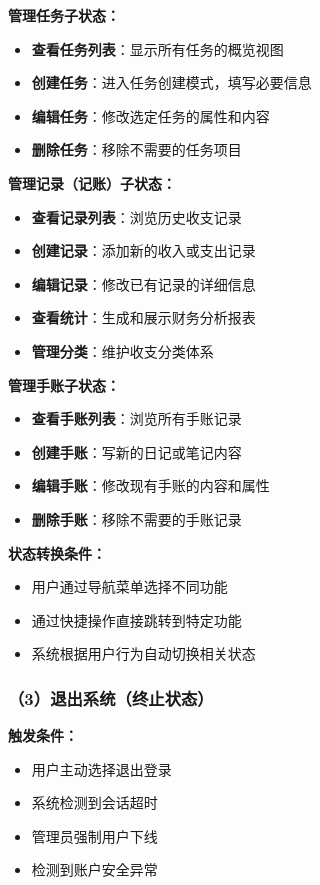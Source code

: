 \documentclass[a4paper]{article}
\begin{document}
\textbf{管理任务子状态：}
\begin{itemize}
    \item \textbf{查看任务列表}：显示所有任务的概览视图
    \item \textbf{创建任务}：进入任务创建模式，填写必要信息
    \item \textbf{编辑任务}：修改选定任务的属性和内容
    \item \textbf{删除任务}：移除不需要的任务项目
\end{itemize}

\textbf{管理记录（记账）子状态：}
\begin{itemize}
    \item \textbf{查看记录列表}：浏览历史收支记录
    \item \textbf{创建记录}：添加新的收入或支出记录
    \item \textbf{编辑记录}：修改已有记录的详细信息
    \item \textbf{查看统计}：生成和展示财务分析报表
    \item \textbf{管理分类}：维护收支分类体系
\end{itemize}

\textbf{管理手账子状态：}
\begin{itemize}
    \item \textbf{查看手账列表}：浏览所有手账记录
    \item \textbf{创建手账}：写新的日记或笔记内容
    \item \textbf{编辑手账}：修改现有手账的内容和属性
    \item \textbf{删除手账}：移除不需要的手账记录
\end{itemize}

\textbf{状态转换条件：}
\begin{itemize}
    \item 用户通过导航菜单选择不同功能
    \item 通过快捷操作直接跳转到特定功能
    \item 系统根据用户行为自动切换相关状态
\end{itemize}

\subsubsection{（3）退出系统（终止状态）}

\textbf{触发条件：}
\begin{itemize}
    \item 用户主动选择退出登录
    \item 系统检测到会话超时
    \item 管理员强制用户下线
    \item 检测到账户安全异常
\end{itemize}
\end{document}
